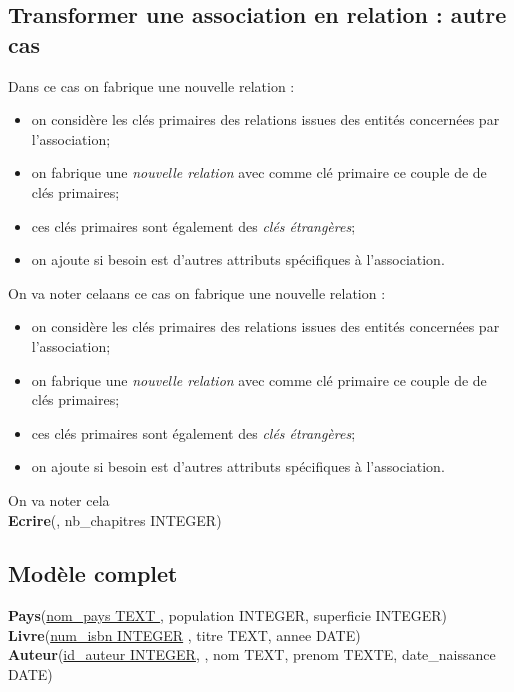 \documentclass[10pt,firamath,cours]{nsi}
\begin{document}
\subsection{Transformer une association en relation : autre cas}
	Dans ce cas on fabrique une nouvelle relation :
	\begin{itemize}
		\item on considère les clés primaires des relations issues des entités concernées par l'association;
		\item on fabrique une \textit{nouvelle relation} avec comme clé primaire ce couple de de clés primaires;
		\item ces clés primaires sont également des \textit{clés étrangères};
		\item on ajoute si besoin est d'autres attributs spécifiques à l'association.
	\end{itemize}
	On va noter celaans ce cas on fabrique une nouvelle relation :
	\begin{itemize}
		\item on considère les clés primaires des relations issues des entités concernées par l'association;
		\item on fabrique une \textit{nouvelle relation} avec comme clé primaire ce couple de de clés primaires;
		\item ces clés primaires sont également des \textit{clés étrangères};
		\item on ajoute si besoin est d'autres attributs spécifiques à l'association.
	\end{itemize}
	On va noter cela\\

	\textbf{Ecrire}(\uline{}, nb\_chapitres INTEGER)\\

\subsection{Modèle complet}

	
		\textbf{Pays}(\uline{nom\_pays TEXT }, population INTEGER, superficie INTEGER)\\

		\textbf{Livre}(\uline{num\_isbn INTEGER} , titre TEXT, annee DATE)\\

		{\scriptsize\textbf{Auteur}(\uline{id\_auteur INTEGER},  , nom TEXT, prenom TEXTE, date\_naissance DATE)\\}
\end{document}

